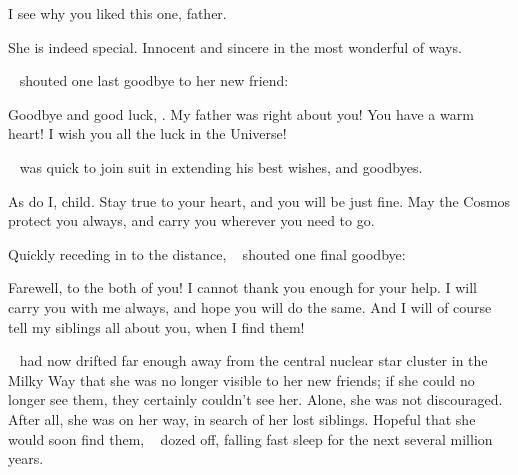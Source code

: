 \documentclass[main.tex]{subfiles}
\begin{document}
\par \Hippe I see why you liked this one, father.

\par \Chiron She is indeed special.  Innocent and sincere in the most wonderful of ways.

\par \nar \rmhippe~ shouted one last goodbye to her new friend:

\par \Hippe Goodbye and good luck, \rmelectra.  My father was right about you!  You have a warm heart!  I wish you all the luck in the Universe!

\par \nar \rmchiron~ was quick to join suit in extending his best wishes, and goodbyes.

\par \Chiron As do I, child.  Stay true to your heart, and you will be just fine.  May the Cosmos protect you always, and carry you wherever you need to go.

\par \nar Quickly receding in to the distance, \rmelectra~ shouted one final goodbye:

\par \Electra Farewell, to the both of you!  I cannot thank you enough for your help.  I will carry you with me always, and hope you will do the same.  And I will of course tell my siblings all about you, when I find them!

\par \nar \rmelectra~ had now drifted far enough away from the central nuclear star cluster in the Milky Way that she was no longer visible to her new friends; if she could no longer see them, they certainly couldn't see her.  Alone, she was not discouraged.  After all, she was on her way, in search of her lost siblings.  Hopeful that she would soon find them, \rmelectra~ dozed off, falling fast sleep for the next several million years.


\end{document}
